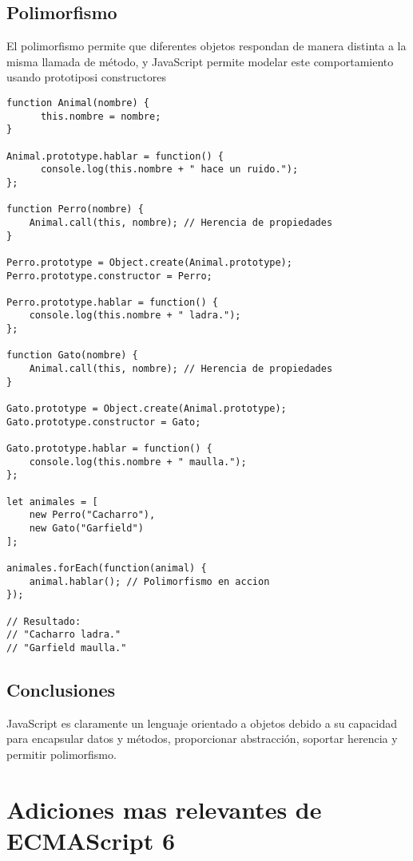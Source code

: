 \documentclass{article}
\begin{document}
\subsection{Polimorfismo}

El polimorfismo permite que diferentes objetos respondan de manera distinta 
a la misma llamada de método, y JavaScript permite modelar este comportamiento
usando prototiposi constructores

\begin{lstlisting}
function Animal(nombre) {
      this.nombre = nombre;
}
      
Animal.prototype.hablar = function() {
      console.log(this.nombre + " hace un ruido.");
};

function Perro(nombre) {
    Animal.call(this, nombre); // Herencia de propiedades
}

Perro.prototype = Object.create(Animal.prototype);
Perro.prototype.constructor = Perro;

Perro.prototype.hablar = function() {
    console.log(this.nombre + " ladra.");
};

function Gato(nombre) {
    Animal.call(this, nombre); // Herencia de propiedades
}

Gato.prototype = Object.create(Animal.prototype);
Gato.prototype.constructor = Gato;

Gato.prototype.hablar = function() {
    console.log(this.nombre + " maulla.");
};

let animales = [
    new Perro("Cacharro"),
    new Gato("Garfield")
];

animales.forEach(function(animal) {
    animal.hablar(); // Polimorfismo en accion
});

// Resultado:
// "Cacharro ladra."
// "Garfield maulla."

\end{lstlisting}

\subsection{Conclusiones}

JavaScript es claramente un lenguaje orientado a objetos debido a su 
capacidad para encapsular datos y métodos, proporcionar abstracción, 
soportar herencia y permitir polimorfismo.

\section{Adiciones mas relevantes de ECMAScript 6}
\end{document}
